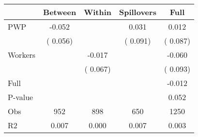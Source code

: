 
\begin{tabular}{l*{4}{c}}\hline&\multicolumn{1}{c}{Between}&\multicolumn{1}{c}{Within}&\multicolumn{1}{c}{Spillovers}&\multicolumn{1}{c}{Full}\\ \hline
 PWP           &             -0.052      &                                               &        0.031 &         0.012                            \\ 
                               &        (       0.056)           &                                       &       (       0.091)     &      (       0.087)                                           \\ 
 Workers       &                                               &       -0.017    &                                &            -0.060                            \\ 
                               &                                               & (       0.067)                  &                                        &      (       0.093)                                           \\ 
\hline                                                                                                                                                                                                                                            
 Full                  &                                               &                                               &                                        &            -0.012                                     \\ 
 P-value               &                                               &                                               &                                        &             0.052                                           \\ 
 Obs                   &               952               &       898                       &       650                &              1250                                               \\ 
 R2                    &                      0.007              &              0.000                      &              0.007               &                     0.003                                              \\ 
\hline \end{tabular}                                                                                                                                                                                                              
